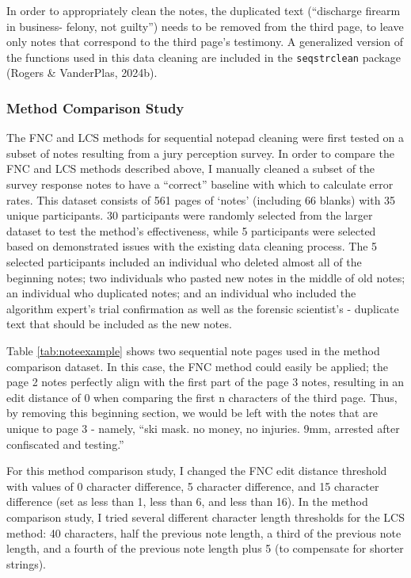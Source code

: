 \documentclass[print]{nuthesis}
\begin{document}
In order to appropriately clean the notes, the duplicated text (``discharge firearm in business- felony, not guilty'') needs to be removed from the third page, to leave only notes that correspond to the third page's testimony.
A generalized version of the functions used in this data cleaning are included in the \texttt{seqstrclean} package (Rogers \& VanderPlas, 2024b).

\hypertarget{method-comparison-study}{%
\subsubsection{Method Comparison Study}\label{method-comparison-study}}

The FNC and LCS methods for sequential notepad cleaning were first tested on a subset of notes resulting from a jury perception survey.
In order to compare the FNC and LCS methods described above, I manually cleaned a subset of the survey response notes to have a ``correct'' baseline with which to calculate error rates.
This dataset consists of 561 pages of `notes' (including 66 blanks) with 35 unique participants.
30 participants were randomly selected from the larger dataset to test the method's effectiveness, while 5 participants were selected based on demonstrated issues with the existing data cleaning process.
The 5 selected participants included an individual who deleted almost all of the beginning notes; two individuals who pasted new notes in the middle of old notes; an individual who duplicated notes; and an individual who included the algorithm expert's trial confirmation as well as the forensic scientist's - duplicate text that should be included as the new notes.

Table \ref{tab:noteexample} shows two sequential note pages used in the method comparison dataset.
In this case, the FNC method could easily be applied; the page 2 notes perfectly align with the first part of the page 3 notes, resulting in an edit distance of 0 when comparing the first n characters of the third page.
Thus, by removing this beginning section, we would be left with the notes that are unique to page 3 - namely, ``ski mask. no money, no injuries. 9mm, arrested after confiscated and testing.''

For this method comparison study, I changed the FNC edit distance threshold with values of 0 character difference, 5 character difference, and 15 character difference (set as less than 1, less than 6, and less than 16).
In the method comparison study, I tried several different character length thresholds for the LCS method: 40 characters, half the previous note length, a third of the previous note length, and a fourth of the previous note length plus 5 (to compensate for shorter strings).
\end{document}
